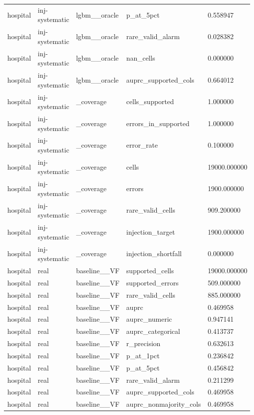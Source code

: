 \begin{tabular}{lllll}
hospital & inj-systematic & lgbm\_\_oracle & p\_at\_5pct & 0.558947 \\
hospital & inj-systematic & lgbm\_\_oracle & rare\_valid\_alarm & 0.028382 \\
hospital & inj-systematic & lgbm\_\_oracle & nan\_cells & 0.000000 \\
hospital & inj-systematic & lgbm\_\_oracle & auprc\_supported\_cols & 0.664012 \\
hospital & inj-systematic & \_coverage & cells\_supported & 1.000000 \\
hospital & inj-systematic & \_coverage & errors\_in\_supported & 1.000000 \\
hospital & inj-systematic & \_coverage & error\_rate & 0.100000 \\
hospital & inj-systematic & \_coverage & cells & 19000.000000 \\
hospital & inj-systematic & \_coverage & errors & 1900.000000 \\
hospital & inj-systematic & \_coverage & rare\_valid\_cells & 909.200000 \\
hospital & inj-systematic & \_coverage & injection\_target & 1900.000000 \\
hospital & inj-systematic & \_coverage & injection\_shortfall & 0.000000 \\
hospital & real & baseline\_\_VF & supported\_cells & 19000.000000 \\
hospital & real & baseline\_\_VF & supported\_errors & 509.000000 \\
hospital & real & baseline\_\_VF & rare\_valid\_cells & 885.000000 \\
hospital & real & baseline\_\_VF & auprc & 0.469958 \\
hospital & real & baseline\_\_VF & auprc\_numeric & 0.947141 \\
hospital & real & baseline\_\_VF & auprc\_categorical & 0.413737 \\
hospital & real & baseline\_\_VF & r\_precision & 0.632613 \\
hospital & real & baseline\_\_VF & p\_at\_1pct & 0.236842 \\
hospital & real & baseline\_\_VF & p\_at\_5pct & 0.456842 \\
hospital & real & baseline\_\_VF & rare\_valid\_alarm & 0.211299 \\
hospital & real & baseline\_\_VF & auprc\_supported\_cols & 0.469958 \\
hospital & real & baseline\_\_VF & auprc\_nonmajority\_cols & 0.469958 \\

\end{tabular}
